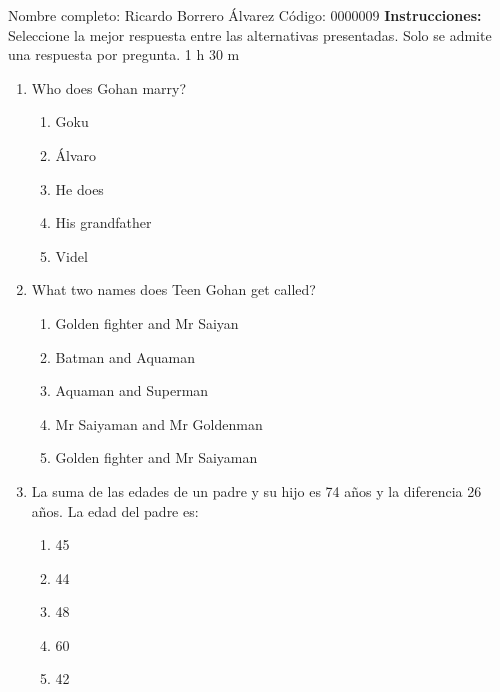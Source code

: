 \documentclass[letterpaper,addpoints,answers,twocolumn,10pt]{exam}
\begin{document}
\noindent Nombre completo: Ricardo Borrero Álvarez
\newline \newline \newline \newline
Código: 0000009\newline \newline 
{\bf Instrucciones:} Seleccione la mejor respuesta entre las alternativas presentadas. Solo se admite una respuesta por pregunta.
 1 h 30 m

\begin{enumerate}[leftmargin=.2in]




\item  Who does Gohan marry?


\begin{enumerate}[noitemsep,leftmargin=0in]


\item  Goku
\item  Álvaro
\item  He does
\item  His grandfather
\item  Videl


\end{enumerate}



\item  What two names does Teen Gohan get called?


\begin{enumerate}[noitemsep,leftmargin=0in]


\item  Golden fighter and Mr Saiyan
\item  Batman and Aquaman
\item  Aquaman and Superman
\item  Mr Saiyaman and Mr Goldenman
\item  Golden fighter and Mr Saiyaman


\end{enumerate}



\item  La suma de las edades de un padre y su hijo es 74 años y la diferencia 26 años. La edad del padre es:


\begin{enumerate}[noitemsep,leftmargin=0in]


\item  45
\item  44
\item  48
\item  60
\item  42



\end{enumerate}
\end{enumerate}
\end{document}
